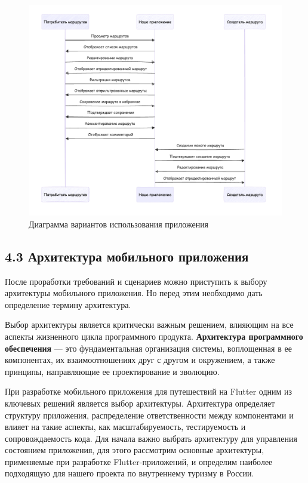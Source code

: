 \begin{figure}[h!]
    \centering
    \includegraphics[width=1\linewidth]{Images/mobile_logic/диаграмма_вариантов_использования.png}
    \caption{Диаграмма вариантов использования приложения}
    \label{fig:use_variants_diagram}
\end{figure}

\subsection*{4.3 Архитектура мобильного приложения}


После проработки требований и сценариев можно приступить к выбору архитектуры мобильного приложения. Но перед этим необходимо дать определение термину архитектура. 

Выбор архитектуры является критически важным решением, влияющим на все аспекты жизненного цикла программного продукта. \textbf{Архитектура программного обеспечения} — это фундаментальная организация системы, воплощенная в ее компонентах, их взаимоотношениях друг с другом и окружением, а также принципы, направляющие ее проектирование и эволюцию.


При разработке мобильного приложения для путешествий на Flutter одним из ключевых решений является выбор архитектуры. Архитектура определяет структуру приложения, распределение ответственности между компонентами и влияет на такие аспекты, как масштабируемость, тестируемость и сопровождаемость кода. Для начала важно выбрать архитектуру для управления состоянием приложения, для этого рассмотрим основные архитектуры, применяемые при разработке Flutter-приложений, и определим наиболее подходящую для нашего проекта по внутреннему туризму в России.

